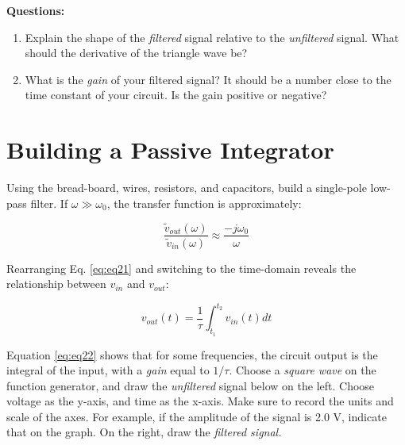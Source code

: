 \documentclass[12pt]{article}
\begin{document}
\textbf{Questions:}
\begin{enumerate}
\item Explain the shape of the \textit{filtered} signal relative to the \textit{unfiltered} signal. What should the derivative of the triangle wave be? \\ \vspace{1.5cm}
\item What is the \textit{gain} of your filtered signal?  It should be a number close to the time constant of your circuit. Is the gain positive or negative? \\ \vspace{1.5cm}
\end{enumerate}

\section{Building a Passive Integrator}

Using the bread-board, wires, resistors, and capacitors, build a single-pole low-pass filter.  If $\omega \gg \omega_0$, the transfer function is approximately:

\begin{equation}
\frac{\tilde{v}_{out}(\omega)}{\tilde{v}_{in}(\omega)} \approx \frac{-j\omega_0}{\omega}
\label{eq:eq21}
\end{equation}

Rearranging Eq. \ref{eq:eq21} and switching to the time-domain reveals the relationship between $v_{in}$ and $v_{out}$:

\begin{equation}
v_{out}(t) = \frac{1}{\tau} \int_{t_1}^{t_2} v_{in}(t) dt
\label{eq:eq22}
\end{equation}

Equation \ref{eq:eq22} shows that for some frequencies, the circuit output is the integral of the input, with a \textit{gain} equal to $1/\tau$.  Choose a \textit{square wave} on the function generator, and draw the \textit{unfiltered} signal below on the left. Choose voltage as the y-axis, and time as the x-axis.  Make sure to record the units and scale of the axes.  For example, if the amplitude of the signal is 2.0 V, indicate that on the graph. On the right, draw the \textit{filtered signal.}
\end{document}
